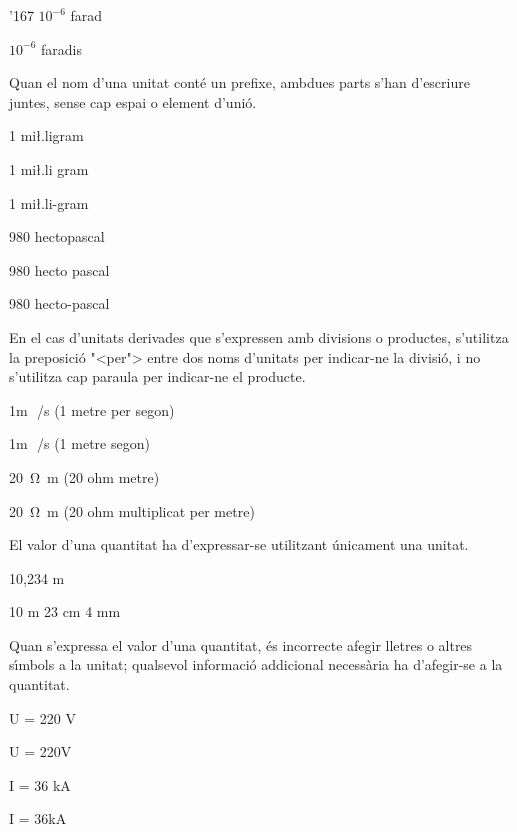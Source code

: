 \begin{dinglist}{'167}
\textcolor{Green}{} $10^{-6}$ farad

\textcolor{Red}{}  $10^{-6}$ faradis


 \item Quan el nom d'una unitat
cont\'{e} un prefixe, ambdues parts s'han d'escriure juntes, sense cap espai o element d'uni\'{o}.

\textcolor{Green}{} 1 mi{\l.l}igram

\textcolor{Red}{} 1 mi{\l.l}i gram

\textcolor{Red}{} 1 mi{\l.l}i-gram

\textcolor{Green}{}  980 hectopascal

\textcolor{Red}{} 980 hecto pascal

\textcolor{Red}{} 980 hecto-pascal


\item En el cas  d'unitats derivades que s'expressen amb divisions o
productes, s'utilitza la preposici\'{o} {"<}per{">} entre dos noms d'unitats
per indicar-ne la divisi\'{o}, i no s'utilitza cap paraula per indicar-ne el
producte.

\textcolor{Green}{} 1\unit{m\,/s} (1 metre per segon)

\textcolor{Red}{}  1\unit{m\,/s} (1 metre segon)

 \textcolor{Green}{} \SI{20}{\ohm.m} (20 ohm metre)

\textcolor{Red}{}   \SI{20}{\ohm.m} (20 ohm multiplicat per metre)


\item El valor d'una quantitat ha d'expressar-se  utilitzant \'{u}nicament una
unitat.

\textcolor{Green}{} 10,234 m

\textcolor{Red}{}  10 m 23 cm 4 mm


\item Quan s'expressa el valor d'una quantitat, \'{e}s incorrecte afegir
lletres o altres s\'{\i}mbols a la unitat; qualsevol informaci\'{o}
addicional necess\`{a}ria ha d'afegir-se a la quantitat.

\textcolor{Green}{} U = 220 V

\textcolor{Red}{}  U = 220\unit{V}

\textcolor{Green}{}  I = 36 kA

\textcolor{Red}{}   I = 36\unit{kA}



\end{dinglist}
